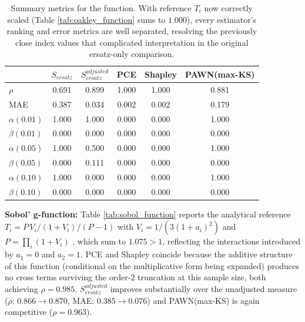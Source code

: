 \documentclass[12pt]{article}
\begin{document}
\begin{table}[H]
\centering
\begin{tabular}{@{}l|ccccc@{}} \toprule
 & $S_{ersatz}$ & $S^{adjusted}_{ersatz}$ & PCE & Shapley & PAWN(max-KS) \\ \midrule
$\rho$           & 0.691 & 0.899 & 1.000 & 1.000 & 0.881 \\
MAE              & 0.387 & 0.034 & 0.002 & 0.002 & 0.179 \\
$\alpha(0.01)$   & 1.000 & 1.000 & 0.000 & 0.000 & 1.000 \\
$\beta(0.01)$    & 0.000 & 0.000 & 0.000 & 0.000 & 0.000 \\
$\alpha(0.05)$   & 1.000 & 0.500 & 0.000 & 0.000 & 1.000 \\
$\beta(0.05)$    & 0.000 & 0.111 & 0.000 & 0.000 & 0.000 \\
$\alpha(0.10)$   & 1.000 & 0.000 & 0.000 & 0.000 & 1.000 \\
$\beta(0.10)$    & 0.000 & 0.000 & 0.000 & 0.000 & 0.000 \\ \bottomrule
\end{tabular}
\caption{Summary metrics for the \cite{oakley2004probabilistic} function. With reference $T_i$ now correctly scaled (Table \ref{tab:oakley_function} sums to $1.000$), every estimator's ranking and error metrics are well separated, resolving the previously close index values that complicated interpretation in the original ersatz-only comparison.}
\label{tab:oakley_summary}
\end{table}

\textbf{Sobol' g-function:} Table \ref{tab:sobol_function} reports the analytical reference $T_i = P\,V_i/(1+V_i)/(P-1)$ with $V_i = 1/(3(1+a_i)^2)$ and $P=\prod_i(1+V_i)$ \citep{Saltelli2008}, which sum to $1.075 > 1$, reflecting the interactions introduced by $a_1=0$ and $a_2=1$. PCE and Shapley coincide because the additive structure of this function (conditional on the multiplicative form being expanded) produces no cross terms surviving the order-2 truncation at this sample size, both achieving $\rho=0.985$. $S^{adjusted}_{ersatz}$ improves substantially over the unadjusted measure ($\rho:\,0.866\to0.870$, MAE: $0.385\to0.076$) and PAWN(max-KS) is again competitive ($\rho=0.963$).
\end{document}
